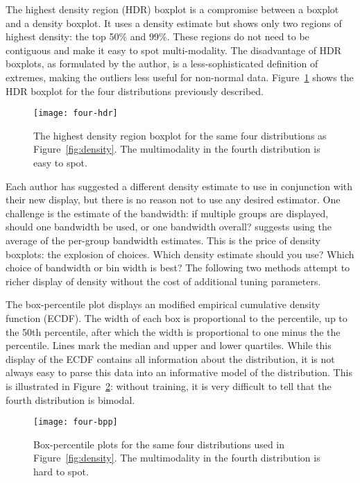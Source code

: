 \documentclass[oneside]{article}
\begin{document}
The highest density region (HDR) boxplot \citep{hyndman:1996a} is a compromise between a boxplot and a density boxplot. It uses a density estimate but shows only two regions of highest density: the top 50\% and 99\%. These regions do not need to be contiguous and make it easy to spot multi-modality.  The disadvantage of HDR boxplots, as formulated by the author, is a less-sophisticated definition of extremes, making the outliers less useful for non-normal data. Figure~\ref{fig:hdr} shows the HDR boxplot for the four distributions previously described.

\begin{figure}[htbp]
  \centering
    \texttt{[image: four-hdr]}%
  \caption{The highest density region boxplot for the same four distributions as Figure~\ref{fig:density}. The multimodality in the fourth distribution is easy to spot.}
  \label{fig:hdr}
\end{figure}

Each author has suggested a different density estimate to use in conjunction with their new display, but there is no reason not to use any desired estimator. One challenge is the estimate of the bandwidth: if multiple groups are displayed, should one bandwidth be used, or one bandwidth overall? \citet{beanplot} suggests using the average of the per-group bandwidth estimates. This is the price of density boxplots: the explosion of choices. Which density estimate should you use? Which choice of bandwidth or bin width is best? The following two methods attempt to richer display of density without the cost of additional tuning parameters.

The box-percentile plot \citep{bpp} displays an modified empirical cumulative density function (ECDF). The width of each box is proportional to the percentile, up to the 50th percentile, after which the width is proportional to one minus the the percentile. Lines mark the median and upper and lower quartiles. While this display of the ECDF contains all information about the distribution, it is not always easy to parse this data into an informative model of the distribution. This is illustrated in Figure~\ref{fig:bpp}: without training, it is very difficult to tell that the fourth distribution is bimodal.

\begin{figure}[htbp]
  \centering
  \texttt{[image: four-bpp]}
  \caption{Box-percentile plots for the same four distributions used in Figure~\ref{fig:density}. The multimodality in the fourth distribution is hard to spot.}
  \label{fig:bpp}
\end{figure}
\end{document}
